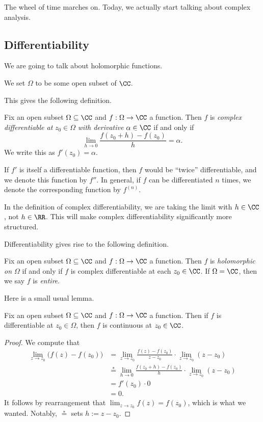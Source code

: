
The wheel of time marches on. Today, we actually start talking about complex analysis.

\subsection{Differentiability}
We are going to talk about holomorphic functions.
\begin{convention}
	We set $\Omega$ to be some open subset of $\CC$.
\end{convention}
This gives the following definition.
\begin{definition}[Differentiable]
	Fix an open subset $\Omega\subseteq\CC$ and $f:\Omega\to\CC$ a function. Then $f$ is \textit{complex differentiable at} $z_0\in\Omega$ \textit{with derivative} $\alpha\in\CC$ if and only if
	\[\lim_{h\to0}\frac{f(z_0+h)-f(z_0)}h=\alpha.\]
	We write this as $f'(z_0)=\alpha$.
\end{definition}
If $f'$ is itself a differentiable function, then $f$ would be ``twice'' differentiable, and we denote this function by $f''$. In general, if $f$ can be differentiated $n$ times, we denote the corresponding function by $f^{(n)}$.
\begin{warn}
	In the definition of complex differentiability, we are taking the limit with $h\in\CC$, not $h\in\RR$. This will make complex differentiability significantly more structured.
\end{warn}
Differentiability gives rise to the following definition.
\begin{definition}
	Fix an open subset $\Omega\subseteq\CC$ and $f:\Omega\to\CC$ a function. Then $f$ is \textit{holomorphic on $\Omega$} if and only if $f$ is complex differentiable at each $z_0\in\CC$. If $\Omega=\CC$, then we say $f$ is \textit{entire}.
\end{definition}
Here is a small usual lemma.
\begin{lemma}
	Fix an open subset $\Omega\subseteq\CC$ and $f:\Omega\to\CC$ a function. Then if $f$ is differentiable at $z_0\in\Omega$, then $f$ is continuous at $z_0\in\CC$.
\end{lemma}
\begin{proof}
	We compute that
	\begin{align*}
		\lim_{z\to z_0}\big(f(z)-f(z_0)\big) &= \lim_{z\to z_0}\frac{f(z)-f(z_0)}{z-z_0}\cdot\lim_{z\to z_0}(z-z_0) \\
		&\stackrel*= \lim_{h\to0}\frac{f(z_0+h)-f(z_0)}h\cdot\lim_{z\to z_0}(z-z_0) \\
		&= f'(z_0)\cdot0 \\
		&= 0.
	\end{align*}
	It follows by rearrangement that $\lim_{z\to z_0}f(z)=f(z_0)$, which is what we wanted. Notably, $\stackrel*=$ sets $h:=z-z_0$.
\end{proof}

